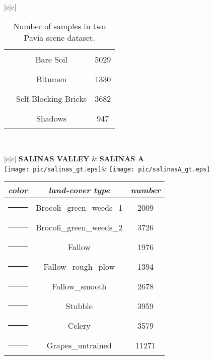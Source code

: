 \documentclass[11pt]{article}
\newcommand\crule[3][black]{\textcolor{#1}{\rule{#2}{#3}}}
\begin{document}
\begin{table}[h]
\begin{tabular}{|c|c|}
\begin{tabular}{ccc}
				\crule[paviaU6]{0.02\textwidth}{0.02\textwidth} &Bare Soil              &5029   \\
				\crule[paviaU7]{0.02\textwidth}{0.02\textwidth} &Bitumen                &1330   \\
				\crule[paviaU8]{0.02\textwidth}{0.02\textwidth} &Self-Blocking Bricks   &3682   \\
				\crule[paviaU9]{0.02\textwidth}{0.02\textwidth} &Shadows                &947    \\
			\end{tabular}\\
			\hline
			\bottomrule
		\end{tabular}
		\caption{Number of samples in two Pavia scene dataset.}
		\label{paviagt}
	\end{table}

	\begin{table}[h]
		\centering
		\begin{tabular}{|c|c|}
			\toprule
			\hline
			\textbf{SALINAS VALLEY}  & \textbf{SALINAS A}\\
			\hline
			\texttt{[image: pic/salinas\_gt.eps]}&
			\texttt{[image: pic/salinasA\_gt.eps]}\\
			\hline
			\begin{tabular}{ccc}
				\toprule
				\textit{color}&\textit{land-cover type}&\textit{number}\\
				\hline
				\crule[salinas_corrected1]{0.02\textwidth}{0.02\textwidth} &Brocoli_green_weeds_1       &2009  \\
				\crule[salinas_corrected2]{0.02\textwidth}{0.02\textwidth} &Brocoli_green_weeds_2       &3726  \\
				\crule[salinas_corrected3]{0.02\textwidth}{0.02\textwidth} &Fallow                      &1976  \\
				\crule[salinas_corrected4]{0.02\textwidth}{0.02\textwidth} &Fallow_rough_plow           &1394  \\
				\crule[salinas_corrected5]{0.02\textwidth}{0.02\textwidth} &Fallow_smooth               &2678  \\
				\crule[salinas_corrected6]{0.02\textwidth}{0.02\textwidth} &Stubble                     &3959  \\
				\crule[salinas_corrected7]{0.02\textwidth}{0.02\textwidth} &Celery                      &3579  \\
				\crule[salinas_corrected8]{0.02\textwidth}{0.02\textwidth} &Grapes_untrained            &11271  \\

\end{tabular}
\end{tabular}
\end{table}
\end{document}
